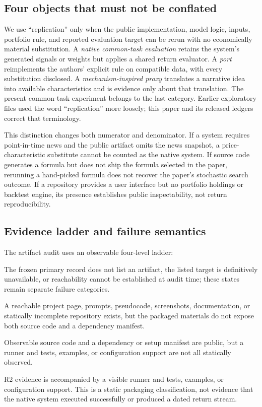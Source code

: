 \documentclass[11pt]{article}
\newcommand{\artifacttier}[1]{\textsf{#1}}
\begin{document}
\subsection{Four objects that must not be conflated}

We use ``replication'' only when the public implementation, model logic, inputs, portfolio rule, and reported evaluation target can be rerun with no economically material substitution. A \emph{native common-task evaluation} retains the system's generated signals or weights but applies a shared return evaluator. A \emph{port} reimplements the authors' explicit rule on compatible data, with every substitution disclosed. A \emph{mechanism-inspired proxy} translates a narrative idea into available characteristics and is evidence only about that translation. The present common-task experiment belongs to the last category. Earlier exploratory files used the word ``replication'' more loosely; this paper and its released ledgers correct that terminology.

This distinction changes both numerator and denominator. If a system requires point-in-time news and the public artifact omits the news snapshot, a price-characteristic substitute cannot be counted as the native system. If source code generates a formula but does not ship the formula selected in the paper, rerunning a hand-picked formula does not recover the paper's stochastic search outcome. If a repository provides a user interface but no portfolio holdings or backtest engine, its presence establishes public inspectability, not return reproducibility.

\subsection{Evidence ladder and failure semantics}

The artifact audit uses an observable four-level ladder:

\begin{description}[style=nextline,leftmargin=1.6em]
  \item[\artifacttier{R0}: no reachable public artifact path.] The frozen primary record does not list an artifact, the listed target is definitively unavailable, or reachability cannot be established at audit time; these states remain separate failure categories.
  \item[\artifacttier{R1}: descriptive or incomplete artifact.] A reachable project page, prompts, pseudocode, screenshots, documentation, or statically incomplete repository exists, but the packaged materials do not expose both source code and a dependency manifest.
  \item[\artifacttier{R2}: packaged executable components.] Observable source code and a dependency or setup manifest are public, but a runner and tests, examples, or configuration support are not all statically observed.
  \item[\artifacttier{R3}: packaged runnable structure.] R2 evidence is accompanied by a visible runner and tests, examples, or configuration support. This is a static packaging classification, not evidence that the native system executed successfully or produced a dated return stream.
\end{description}
\end{document}
